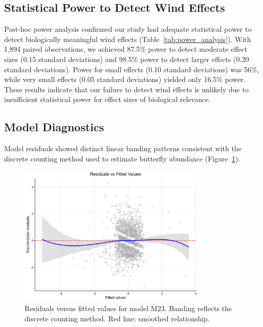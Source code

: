 \subsection{Statistical Power to Detect Wind Effects}

Post-hoc power analysis confirmed our study had adequate statistical power to detect biologically meaningful wind effects (Table~\ref{tab:power_analysis}). With 1,894 paired observations, we achieved 87.5\% power to detect moderate effect sizes (0.15 standard deviations) and 98.5\% power to detect larger effects (0.20 standard deviations). Power for small effects (0.10 standard deviations) was 56\%, while very small effects (0.05 standard deviations) yielded only 16.5\% power. These results indicate that our failure to detect wind effects is unlikely due to insufficient statistical power for effect sizes of biological relevance.



\subsection{Model Diagnostics}

Model residuals showed distinct linear banding patterns consistent with the discrete counting method used to estimate butterfly abundance (Figure~\ref{fig:residuals}).

\begin{figure}[htbp]
\centering
\includegraphics[width=0.8\textwidth]{supplemental/results/thesis_exports/figures/residuals_vs_fitted.png}
\caption{Residuals versus fitted values for model M23. Banding reflects the discrete counting method. Red line: smoothed relationship.}\label{fig:residuals}
\end{figure}

